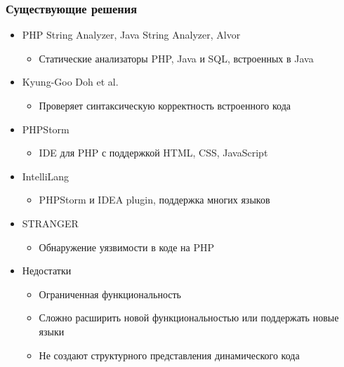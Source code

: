 \documentclass{beamer}
\begin{document}
\begin{frame}
  \transwipe[direction=90]
  \frametitle{Существующие решения}
  \begin{itemize}
    \item PHP String Analyzer, Java String Analyzer, Alvor
    \begin{itemize}
      \item Статические анализаторы PHP, Java и SQL, встроенных в Java 
    \end{itemize}

    \item Kyung-Goo Doh et al.
    \begin{itemize}
      \item Проверяет синтаксическую корректность встроенного кода
    \end{itemize}

    \item PHPStorm
    \begin{itemize}
      \item IDE для PHP с поддержкой HTML, CSS, JavaScript
    \end{itemize}

    \item IntelliLang
    \begin{itemize}
      \item PHPStorm и IDEA plugin, поддержка многих языков
    \end{itemize} 

    \item STRANGER
    \begin{itemize}
      \item Обнаружение уязвимости в коде на PHP
    \end{itemize}
  \end{itemize}
  
  \begin{itemize}
    \item Недостатки
    \begin{itemize}
      \item Ограниченная функциональность
      \item Сложно расширить новой функциональностью или поддержать новые языки
      \item Не создают структурного представления динамического кода
    \end{itemize}
  \end{itemize}
\end{frame}
\end{document}
